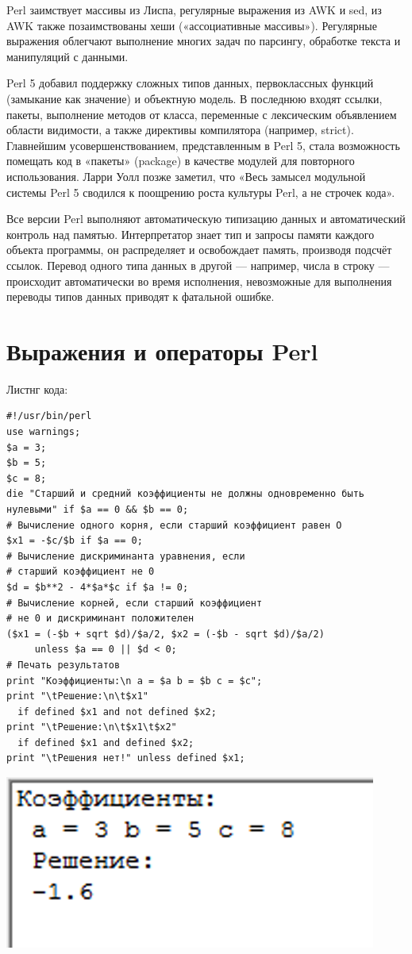 \documentclass[14pt,article]{scrartcl}
\begin{document}
Perl заимствует массивы из Лиспа, регулярные выражения из AWK и sed, из AWK также позаимствованы хеши («ассоциативные массивы»). Регулярные выражения облегчают выполнение многих задач по парсингу, обработке текста и манипуляций с данными.

Perl 5 добавил поддержку сложных типов данных, первоклассных функций (замыкание как значение) и объектную модель. В последнюю входят ссылки, пакеты, выполнение методов от класса, переменные с лексическим объявлением области видимости, а также директивы компилятора (например, strict). Главнейшим усовершенствованием, представленным в Perl 5, стала возможность помещать код в «пакеты» (package) в качестве модулей для повторного использования. Ларри Уолл позже заметил, что «Весь замысел модульной системы Perl 5 сводился к поощрению роста культуры Perl, а не строчек кода».

Все версии Perl выполняют автоматическую типизацию данных и автоматический контроль над памятью. Интерпретатор знает тип и запросы памяти каждого объекта программы, он распределяет и освобождает память, производя подсчёт ссылок. Перевод одного типа данных в другой — например, числа в строку — происходит автоматически во время исполнения, невозможные для выполнения переводы типов данных приводят к фатальной ошибке.
\newpage

\section*{Выражения и операторы Perl}
\onehalfspacing

Листнг кода:
\begin{verbatim}
#!/usr/bin/perl
use warnings;
$a = 3;
$b = 5;
$c = 8;
die "Старший и средний коэффициенты не должны одновременно быть нулевыми" if $a == 0 && $b == 0;
# Вычисление одного корня, если старший коэффициент равен О
$x1 = -$c/$b if $а == 0;
# Вычисление дискриминанта уравнения, если
# старший коэффициент не 0
$d = $b**2 - 4*$a*$c if $a != 0;
# Вычисление корней, если старший коэффициент
# не 0 и дискриминант положителен
($x1 = (-$b + sqrt $d)/$a/2, $x2 = (-$b - sqrt $d)/$a/2)
     unless $a == 0 || $d < 0;
# Печать результатов
print "Коэффициенты:\n a = $a b = $b с = $c";
print "\tРешение:\n\t$x1"
  if defined $x1 and not defined $x2;
print "\tРешение:\n\t$x1\t$x2"
  if defined $x1 and defined $x2;
print "\tРешения нет!" unless defined $x1;
\end{verbatim}

\hfill \break
\includegraphics{q}
\end{document}

